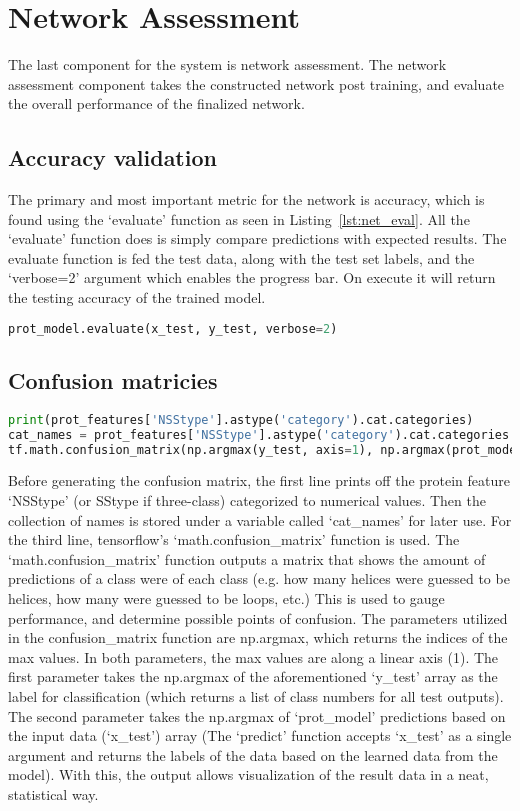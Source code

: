 \documentclass[12pt,letterpaper,oneside,reqno]{book}
\theoremstyle{plain}
\theoremstyle{definition}
\theoremstyle{plain}
\theoremstyle{remark}
\theoremstyle{plain}
\theoremstyle{definition}
\theoremstyle{plain}
\begin{document}
\section{Network Assessment}
The last component for the system is network assessment. The network assessment component takes the constructed network post training, and evaluate the overall performance of the finalized network.
\subsection{Accuracy validation}
The primary and most important metric for the network is accuracy, which is found using the `evaluate' function as seen in Listing~\ref{lst:net_eval}. All the `evaluate' function does is simply compare predictions with expected results. The evaluate function is fed the test data, along with the test set labels, and the `verbose=2' argument which enables the progress bar. On execute it will return the testing accuracy of the trained model. 
\begin{lstlisting}[language=Python, caption={Network Evaluation Code}, label = lst:net_eval, frame=single]
prot_model.evaluate(x_test, y_test, verbose=2)
\end{lstlisting}

\subsection{Confusion matricies}
\begin{lstlisting}[language=Python, caption={Confusion Matrix Generation Code}, label=lst:conf_matrix, frame=single]
print(prot_features['NSStype'].astype('category').cat.categories)
cat_names = prot_features['NSStype'].astype('category').cat.categories
tf.math.confusion_matrix(np.argmax(y_test, axis=1), np.argmax(prot_model.predict(x_test), axis=1))
\end{lstlisting}

Before generating the confusion matrix, the first line prints off the protein feature `NSStype' (or SStype if three-class) categorized to numerical values. Then the collection of names is stored under a variable called `cat\_names' for later use. For the third line, tensorflow's `math.confusion\_matrix' function is used. The `math.confusion\_matrix' function outputs a matrix that shows the amount of predictions of a class were of each class (e.g. how many helices were guessed to be helices, how many were guessed to be loops, etc.) This is used to gauge performance, and determine possible points of confusion. The parameters utilized in the confusion\_matrix function are np.argmax, which returns the indices of the max values. In both parameters, the max values are along a linear axis (1). The first parameter takes the np.argmax of the aforementioned `y\_test' array as the label for classification (which returns a list of class numbers for all test outputs). The second parameter takes the np.argmax of  `prot\_model' predictions based on the input data (`x\_test') array (The `predict' function accepts `x\_test' as a single argument and returns the labels of the data based on the learned data from the model). With this, the output allows visualization of the result data in a neat, statistical way.
\end{document}
